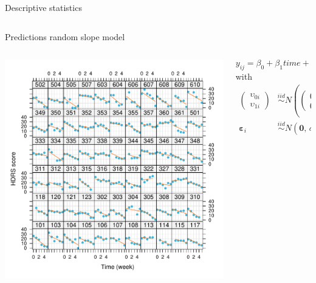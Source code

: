 \documentclass[aspectratio=169]{beamer}
\newcommand{\vect}[1]{\mathbf{#1}}
\newcommand{\mat}[1]{\mathbf{#1}}
\newcommand{\gvect}[1]{\boldsymbol{#1}}
\newcommand{\gmat}[1]{\boldsymbol{#1}}
\begin{document}
\begin{frame}{Descriptive statistics}
\begin{columns}
\begin{column}{.6\textwidth}
  \vspace{1cm}
\end{column}
\end{columns}
\end{frame}

\begin{frame}{Predictions random slope model}
  \begin{columns}
    \begin{column}{.6\textwidth}
    \includegraphics[scale=.5]{../figures/hdrs-ind_pred-randomslope}
    \end{column}
  \begin{column}{.4\textwidth}
  \[
    y_{ij} = \beta_0 + \beta_1 time + \upsilon_{0i} + \upsilon_{1i} time +
    \varepsilon_{ij}
  \]
with
\begin{align*}
  \begin{pmatrix} \upsilon_{0i}\\ \upsilon_{1i} \end{pmatrix} &\overset{iid}\sim
    N \left(\begin{pmatrix} 0\\ 0 \end{pmatrix}, \, \gmat{\Sigma}_\upsilon =
      \begin{pmatrix}
        \sigma^2_{\upsilon_0} & \sigma_{\upsilon_0 \upsilon_1} \\
        \sigma_{\upsilon_0 \upsilon_1} & \sigma^2_{\upsilon_1} \\
      \end{pmatrix} \right)\\
  \gvect{\varepsilon}_i &\overset{iid}\sim N(\vect{0}, \, \sigma^2 \mat{I}_{n_i})
\end{align*}
  \end{column}
\end{columns}
\end{frame}
\end{document}

